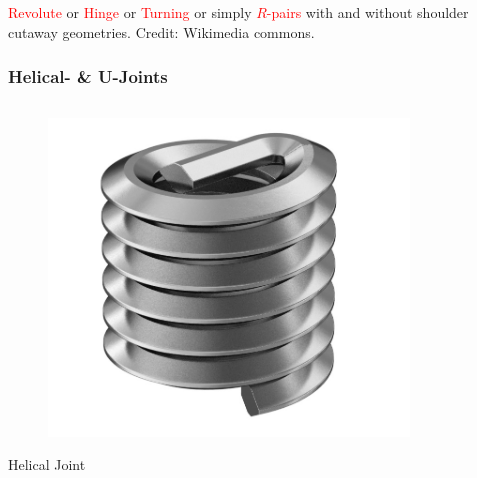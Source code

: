 \begin{frame}
\begin{columns}[t]
\begin{column}{.5\textwidth}
\begin{figure}
			\end{figure}
		\end{column}
	\end{columns}
	 \footnotesize{\textcolor{red}{Revolute} or \textcolor{red}{Hinge} or \textcolor{red}{Turning} or simply \textcolor{red}{$R$-pairs} with and without shoulder cutaway geometries. Credit: Wikimedia commons.}
\end{frame}


\begin{frame}
	\frametitle{Helical- \& U-Joints}
	\begin{columns}[t]		
		\begin{column}{.5\textwidth}
			\begin{figure}
				\centering
				\includegraphics[width=\textwidth]{figures/helical.jpg}
			\end{figure}
			\centering Helical Joint
		\end{column}	
		\begin{column}{.5\textwidth}
			\begin{figure}
			\centering

\end{figure}
\end{column}
\end{columns}
\end{frame}
